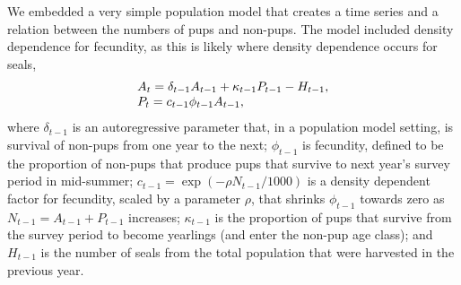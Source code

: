 \documentclass[12pt, titlepage]{article}\usepackage[]{graphicx}\usepackage[]{color}
\begin{document}
We embedded a very simple population model that creates a time series and a relation between the numbers of pups and non-pups.  The model included density dependence \citep[][p. 511]{Casw:matr:2001} for fecundity, as this is likely where density dependence occurs for seals, 
%
\begin{equation}\label{eq:popmod}
  \begin{tabular}{l}
    $A_t = \delta_{t-1}A_{t-1} + \kappa_{t-1} P_{t-1} - H_{t-1}$, \\
		$P_t = c_{t-1}\phi_{t-1}A_{t-1}$,
  \end{tabular}
\end{equation}
%
where $\delta_{t-1}$ is an autoregressive parameter that, in a population model setting, is survival of non-pups from one year to the next; $\phi_{t-1}$ is fecundity, defined to be the proportion of non-pups that produce pups that survive to next year's survey period in mid-summer; $c_{t-1} = \exp(-\rho N_{t-1}/1000)$ is a density dependent factor for fecundity, scaled by a parameter $\rho$, that shrinks $\phi_{t-1}$ towards zero as $N_{t-1} = A_{t-1} + P_{t-1}$ increases;  $\kappa_{t-1}$ is the proportion of pups that survive from the survey period to become yearlings (and enter the non-pup age class); and $H_{t-1}$ is the number of seals from the total population that were harvested in the previous year.
\end{document}
